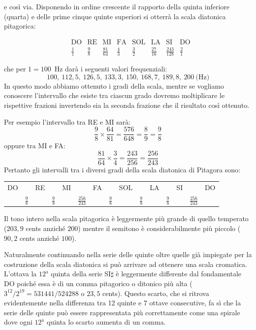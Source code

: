 e così via.
Disponendo in ordine crescente il rapporto della quinta inferiore (quarta) e
delle prime cinque quinte superiori si otterrà la scala diatonica pitagorica:

\[
  \begin{array}{lcccccccc}
     & \text{DO} & \text{RE} & \text{MI} & \text{FA} & \text{SOL} & \text{LA} & \text{SI} & \text{DO} \\[4pt]
     & \tfrac{1}{1} & \tfrac{9}{8} & \tfrac{81}{64} & \tfrac{4}{3}
     & \tfrac{3}{2} & \tfrac{27}{16} & \tfrac{243}{128} & \tfrac{2}{1}
  \end{array}
\]

\vspace{6pt}

che per $1 = 100$~Hz darà i seguenti valori frequenziali:
\[
  100,\ 112{,}5,\ 126{,}5,\ 133{,}3,\ 150,\ 168{,}7,\ 189{,}8,\ 200~\text{(Hz)}
\]
In questo modo abbiamo ottenuto i gradi della scala, mentre se vogliamo
conoscere l'intervallo che esiste tra ciascun grado dovremo moltiplicare le
rispettive frazioni invertendo sia la seconda frazione che il risultato così
ottenuto. 

Per esempio l'intervallo tra RE e MI sarà:
\[
  \frac{9}{8} \times \frac{64}{81} = \frac{576}{648} = \frac{8}{9} = \frac{9}{8}
\]
oppure tra MI e FA:
\[
  \frac{81}{64} \times \frac{3}{4} = \frac{243}{256} = \frac{256}{243}
\]
Pertanto gli intervalli tra i diversi gradi della scala diatonica di Pitagora
sono:

\begin{center}\small
\begin{tabular}{*{15}{c}}
  DO & & RE & & MI & & FA & & SOL & & LA & & SI & & DO \\
  & $\tfrac{9}{8}$ & & $\tfrac{9}{8}$ & & $\tfrac{256}{243}$ & & $\tfrac{9}{8}$
  & & $\tfrac{9}{8}$ & & $\tfrac{9}{8}$ & & $\tfrac{256}{243}$ \\
\end{tabular}
\end{center}

Il tono intero nella scala pitagorica è leggermente più grande di quello
temperato ($203{,}9$ cents anziché $200$) mentre il semitono è considerabilmente
più piccolo ($90{,}2$ cents anziché $100$).

Naturalmente continuando nella serie delle quinte oltre quelle già impiegate per
la costruzione della scala diatonica si può arrivare ad ottenere una scala
cromatica. L'ottava la $12^{\text{a}}$ quinta della serie SI$\sharp$ è
leggermente differente dal fondamentale DO poiché essa è di un comma pitagorico
o ditonico più alta ($3^{12}/2^{19} = 531441/524288$ o $23{,}5$ cents). Questo
scarto, che si ritrova evidentemente nella differenza tra 12 quinte e 7 ottave
consecutive, fa sì che la serie delle quinte può essere rappresentata più
correttamente come una spirale dove ogni $12^{\text{a}}$ quinta lo scarto
aumenta di un comma.

